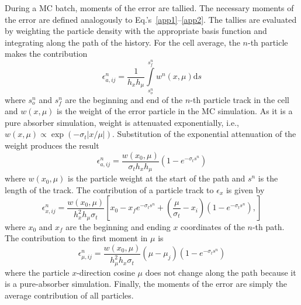 \documentclass{mc2013}
\renewcommand{\d}{\mathrm{d}}
\begin{document}
During a MC batch, moments of the error are tallied.  The necessary moments of the error are
defined analogously to Eq.'s~\eqref{app1}--\eqref{app2}.
The tallies are evaluated by weighting the particle density with the appropriate
basis function and integrating along the path of the history.  For the cell average, the $n$-th
particle makes the contribution
\begin{equation}
    \epsilon^n_{a,ij} = \frac{1}{h_xh_\mu} \int\limits_{s^n_o}^{s^n_f}  w^n(x,\mu) \d s
\end{equation}
where $s_o^n$ and $s_f^n$ are the beginning and end of the $n$-th particle track in the cell and $w(x,\mu)$ is
the weight of the error particle in the MC simulation.  As it is a pure absorber
simulation, weight is attenuated exponentially, i.e., $w(x,\mu)\propto
\exp(-\sigma_t|x/\mu|)$.
Substitution of the exponential attenuation of the weight produces the result
\begin{equation}
    \epsilon^n_{a,ij} = \frac{w(x_0,\mu)}{\sigma_t h_x h_\mu} \left(1 - e^{-\sigma_ts^n}\right)
\end{equation}
where $w(x_0,\mu)$ is the particle weight at the start of the path and $s^n$ is the
length of the track. The contribution of a
particle track to $\epsilon_x$ is given by
\begin{equation}
    \epsilon^n_{x,ij} = \frac{w(x_0,\mu)}{h_x^2h_\mu \sigma_t} \left[x_0 - x_f e^{-\sigma_t s^n}
        + \left(\frac{\mu}{\sigma_t} - x_i \right)\left(1-e^{-\sigma_t s^n}\right),
    \right]
\end{equation}
where $x_0$ and $x_f$ are the beginning and ending $x$ coordinates of the $n$-th
path.  The contribution to the first moment in $\mu$ is 
\begin{equation}
    \epsilon^n_{\mu,ij} = \frac{w(x_0,\mu)}{h_{\mu}^2h_x\sigma_t}\left(\mu - \mu_j\right) \left(1 - e^{-\sigma_ts^n}\right)
\end{equation}
where the particle $x$-direction cosine $\mu$ does not change along the path because it is a pure-absorber simulation.
Finally, the moments of the error are simply the average contribution of all particles.
\end{document}
